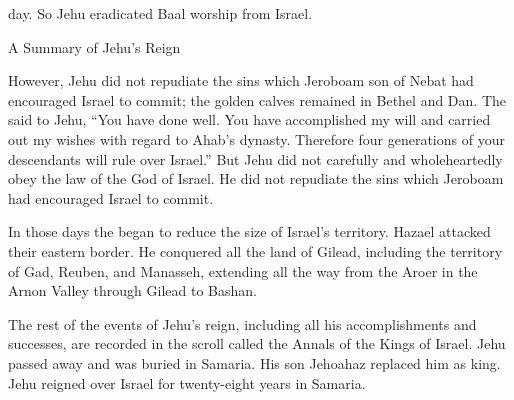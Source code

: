 {day.
So Jehu
eradicated
Baal
worship from Israel.
\par }{\SH A Summary of Jehu’s Reign
\par }{\PP {}However,
Jehu
did not
repudiate
the sins
which
Jeroboam
son
of Nebat
had
encouraged
Israel
to commit;
the golden
calves
remained in Bethel
and Dan.
The
{}
said
to
Jehu,
“You have
done
well.
You have
accomplished
my will and carried out my wishes
with regard
to Ahab’s
dynasty.
Therefore four generations
of your descendants
will rule
over
Israel.”
But Jehu
did not
carefully
and wholeheartedly
obey
the law
of the {}
God
of Israel.
He did not
repudiate
the sins
which Jeroboam
had
encouraged
Israel
to commit.
\par }{\PP {}In those
days
the {}
began
to reduce
the size of Israel’s
territory. Hazael
attacked
their eastern border.
He conquered
all
the land
of Gilead,
including the territory of Gad,
Reuben,
and Manasseh,
extending
all the way from the Aroer
in
the Arnon
Valley
through Gilead
to Bashan.
\par }{\PP {}The rest
of the events
of Jehu’s
reign, including all
his accomplishments
and successes, are
recorded
in the scroll
called the Annals
of the Kings
of Israel.
Jehu
passed away
and was buried
in Samaria.
His son
Jehoahaz
replaced
him as king.
Jehu
reigned
over
Israel
for twenty-eight
years
in Samaria.

}
